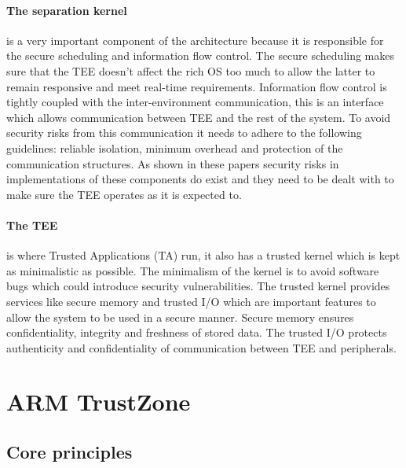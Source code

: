 \documentclass{report}
\begin{document}
\paragraph*{The separation kernel}
is a very important component of the architecture because it is responsible for the secure scheduling and information flow control. The secure scheduling makes sure that the TEE doesn't affect the rich OS too much to allow the latter to remain responsive and meet real-time requirements. Information flow control is tightly coupled with the inter-environment communication, this is an interface which allows communication between TEE and the rest of the system. To avoid security risks from this communication it needs to adhere to the following guidelines: reliable isolation, minimum overhead and protection of the communication structures. As shown in these papers \cite{VanBulckJo2019AToT} \cite{GuoPengfei2021RoAT} \cite{KhalidFatima2020HITS} \cite{Machiry2017BOOMERANGET} security risks in implementations of these components do exist and they need to be dealt with to make sure the TEE operates as it is expected to.

\paragraph*{The TEE}
is where Trusted Applications (TA) run, it also has a trusted kernel which is kept as minimalistic as possible. The minimalism of the kernel is to avoid software bugs which could introduce security vulnerabilities. The trusted kernel provides services like secure memory and trusted I/O which are important features to allow the system to be used in a secure manner. Secure memory ensures confidentiality, integrity and freshness of stored data. The trusted I/O protects authenticity and confidentiality of communication between TEE and peripherals.

\section{ARM TrustZone}

\subsection*{Core principles}
\end{document}
